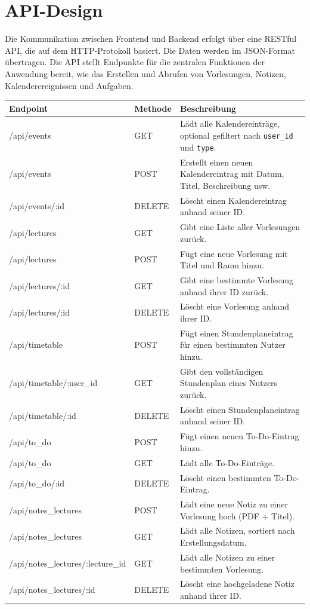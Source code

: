 \section{API-Design}
Die Kommunikation zwischen Frontend und Backend erfolgt über eine RESTful API, die auf dem HTTP-Protokoll basiert. Die Daten werden im JSON-Format übertragen. Die API stellt Endpunkte für die zentralen Funktionen der Anwendung bereit, wie das Erstellen und Abrufen von Vorlesungen, Notizen, Kalenderereignissen und Aufgaben.\\
\begin{longtable}{|p{6cm}|p{2cm}|p{6cm}|}
\hline
\textbf{Endpoint} & \textbf{Methode} & \textbf{Beschreibung} \\
\hline
/api/events & GET & Lädt alle Kalendereinträge, optional gefiltert nach \texttt{user\_id} und \texttt{type}. \\
\hline
/api/events & POST & Erstellt einen neuen Kalendereintrag mit Datum, Titel, Beschreibung usw. \\
\hline
/api/events/:id & DELETE & Löscht einen Kalendereintrag anhand seiner ID. \\
\hline
/api/lectures & GET & Gibt eine Liste aller Vorlesungen zurück. \\
\hline
/api/lectures & POST & Fügt eine neue Vorlesung mit Titel und Raum hinzu. \\
\hline
/api/lectures/:id & GET & Gibt eine bestimmte Vorlesung anhand ihrer ID zurück. \\
\hline
/api/lectures/:id & DELETE & Löscht eine Vorlesung anhand ihrer ID. \\
\hline
/api/timetable & POST & Fügt einen Stundenplaneintrag für einen bestimmten Nutzer hinzu. \\
\hline
/api/timetable/:user\_id & GET & Gibt den vollständigen Stundenplan eines Nutzers zurück. \\
\hline
/api/timetable/:id & DELETE & Löscht einen Stundenplaneintrag anhand seiner ID. \\
\hline
/api/to\_do & POST & Fügt einen neuen To-Do-Eintrag hinzu. \\
\hline
/api/to\_do & GET & Lädt alle To-Do-Einträge. \\
\hline
/api/to\_do/:id & DELETE & Löscht einen bestimmten To-Do-Eintrag. \\
\hline
/api/notes\_lectures & POST & Lädt eine neue Notiz zu einer Vorlesung hoch (PDF + Titel). \\
\hline
/api/notes\_lectures & GET & Lädt alle Notizen, sortiert nach Erstellungsdatum. \\
\hline
/api/notes\_lectures/:lecture\_id & GET & Lädt alle Notizen zu einer bestimmten Vorlesung. \\
\hline
/api/notes\_lectures/:id & DELETE & Löscht eine hochgeladene Notiz anhand ihrer ID. \\
\hline
\end{longtable}

